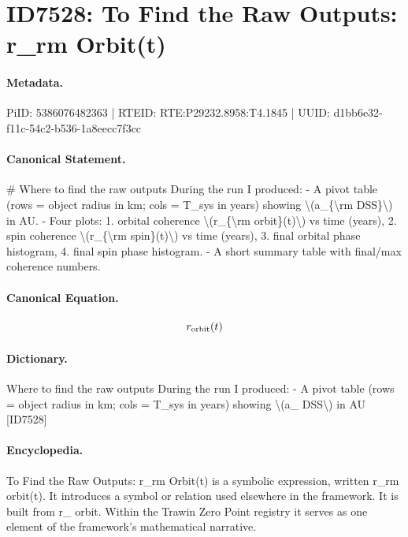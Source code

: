 \section*{ID7528: To Find the Raw Outputs: r\_rm Orbit(t)}
\paragraph{Metadata.}
PiID: 5386076482363 | RTEID: RTE:P29232.8958:T4.1845 | UUID: d1bb6e32-f11c-54c2-b536-1a8eecc7f3cc

\paragraph{Canonical Statement.}
\# Where to find the raw outputs During the run I produced: - A pivot table (rows = object radius in km; cols = T\_sys in years) showing \textbackslash{}(a\_\{\textbackslash{}rm DSS\}\textbackslash{}) in AU. - Four plots: 1. orbital coherence \textbackslash{}(r\_\{\textbackslash{}rm orbit\}(t)\textbackslash{}) vs time (years), 2. spin coherence \textbackslash{}(r\_\{\textbackslash{}rm spin\}(t)\textbackslash{}) vs time (years), 3. final orbital phase histogram, 4. final spin phase histogram. - A short summary table with final/max coherence numbers.

\paragraph{Canonical Equation.}
\[
r_{\rm orbit}(t)
\]

\paragraph{Dictionary.}
Where to find the raw outputs During the run I produced: - A pivot table (rows = object radius in km; cols = T\_sys in years) showing \textbackslash{}(a\_ DSS\textbackslash{}) in AU [ID7528]

\paragraph{Encyclopedia.}
To Find the Raw Outputs: r\_rm Orbit(t) is a symbolic expression, written r\_rm orbit(t). It introduces a symbol or relation used elsewhere in the framework. It is built from r\_ orbit. Within the Trawin Zero Point registry it serves as one element of the framework's mathematical narrative.
